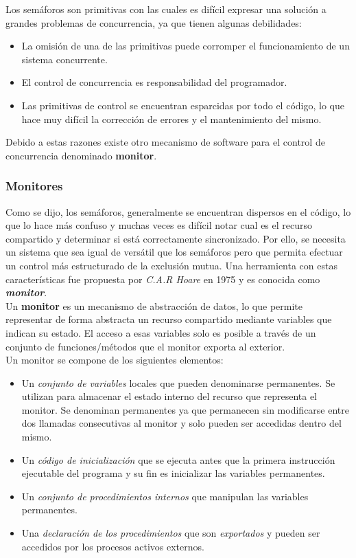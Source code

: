 Los semáforos son primitivas con las cuales es difícil expresar una solución a grandes problemas de concurrencia, ya que tienen algunas debilidades:
\begin{itemize}
    \item La omisión de una de las primitivas puede corromper el funcionamiento de un sistema concurrente.
    \item El control de concurrencia es responsabilidad del programador.
    \item Las primitivas de control se encuentran esparcidas por todo el código, lo que hace muy difícil la corrección de errores y el mantenimiento del mismo.
\end{itemize}

Debido a estas razones existe otro mecanismo de software para el control de concurrencia denominado \textbf{monitor}.

\subsubsection{Monitores}
Como se dijo, los semáforos, generalmente se encuentran dispersos en el código, lo que lo hace más confuso y muchas veces es difícil notar cual es el recurso compartido y determinar si está correctamente sincronizado. Por ello, se necesita un sistema que sea igual de versátil que los semáforos pero que permita efectuar un control más estructurado de la exclusión mutua. Una herramienta con estas características fue propuesta por \textit{C.A.R Hoare} en 1975 y es conocida como \textbf{\textit{monitor}}.\\
Un \textbf{monitor} es un mecanismo de abstracción de datos, lo que permite representar de forma abstracta un recurso compartido mediante variables que indican su estado. El acceso a esas variables solo es posible a través de un conjunto de funciones/métodos que el monitor exporta al exterior.\\

Un monitor se compone de los siguientes elementos:
\begin{itemize}
    \item Un \textit{conjunto de variables} locales que pueden denominarse permanentes. Se utilizan para almacenar el estado interno del recurso que representa el monitor. Se denominan permanentes ya que permanecen sin modificarse entre dos llamadas consecutivas al monitor y solo pueden ser accedidas dentro del mismo.
    
    \item Un \textit{código de inicialización} que se ejecuta antes que la primera instrucción ejecutable del programa y su fin es inicializar las variables permanentes. 

    \item Un \textit{conjunto de procedimientos internos} que manipulan las variables permanentes.
    
    \item Una \textit{declaración de los procedimientos} que son \textit{exportados} y pueden ser accedidos por los procesos activos externos.
\end{itemize}

